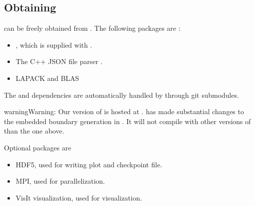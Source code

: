 \documentclass[letterpaper,10pt,english]{sphinxmanual}
\begin{document}
\subsection{Obtaining }
\label{\detokenize{Base/GettingStarted:obtaining-chombo-discharge}}
 can be freely obtained from .
The following packages are :
\begin{itemize}
\item {} 
, which is supplied with .

\item {} 
The C++ JSON file parser .

\item {} 
LAPACK and BLAS

\end{itemize}

The  and  dependencies are automatically handled by  through git submodules.

\begin{sphinxadmonition}{warning}{Warning:}
Our version of  is hosted at .
 has made substantial changes to the embedded boundary generation in .
It will not compile with other versions of  than the one above.
\end{sphinxadmonition}

Optional packages are
\begin{itemize}
\item {} 
HDF5, used for writing plot and checkpoint file.

\item {} 
MPI, used for parallelization.

\item {} 
VisIt visualization, used for visualization.

\end{itemize}
\end{document}
